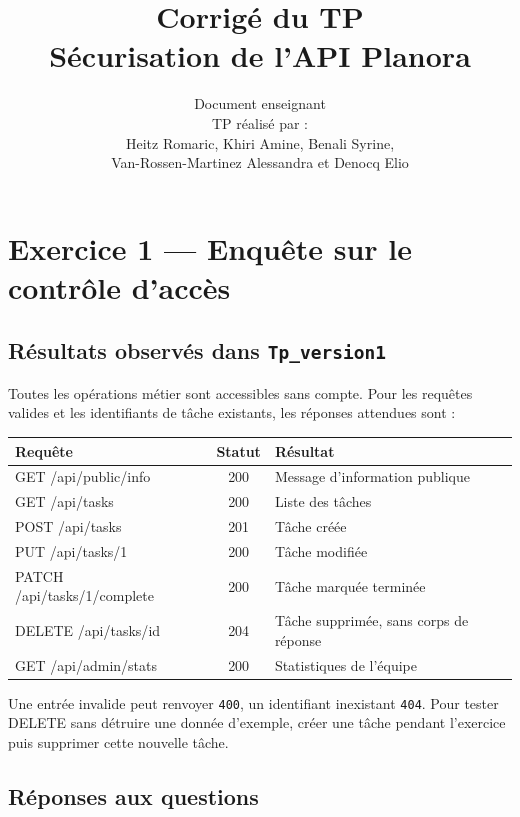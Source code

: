 \documentclass[11pt,a4paper]{article}
\title{Corrigé du TP\\\large Sécurisation de l’API Planora}
\author{Document enseignant\\[4pt]\small TP réalisé par :\\Heitz Romaric, Khiri Amine, Benali Syrine,\\Van-Rossen-Martinez Alessandra et Denocq Elio}
\date{}
\begin{document}
\maketitle
\tableofcontents
\newpage

\section{Exercice 1 — Enquête sur le contrôle d’accès}

\subsection{Résultats observés dans \texttt{Tp\_version1}}

Toutes les opérations métier sont accessibles sans compte. Pour les requêtes valides et les identifiants de tâche existants, les réponses attendues sont :

\begin{center}
\begin{tabularx}{\linewidth}{>{\ttfamily}l c X}
\toprule
Requête & Statut & Résultat \\
\midrule
GET /api/public/info & 200 & Message d’information publique \\
GET /api/tasks & 200 & Liste des tâches \\
POST /api/tasks & 201 & Tâche créée \\
PUT /api/tasks/1 & 200 & Tâche modifiée \\
PATCH /api/tasks/1/complete & 200 & Tâche marquée terminée \\
DELETE /api/tasks/{id} & 204 & Tâche supprimée, sans corps de réponse \\
GET /api/admin/stats & 200 & Statistiques de l’équipe \\
\bottomrule
\end{tabularx}
\end{center}

Une entrée invalide peut renvoyer \texttt{400}, un identifiant inexistant \texttt{404}. Pour tester DELETE sans détruire une donnée d’exemple, créer une tâche pendant l’exercice puis supprimer cette nouvelle tâche.

\subsection{Réponses aux questions}
\end{document}
